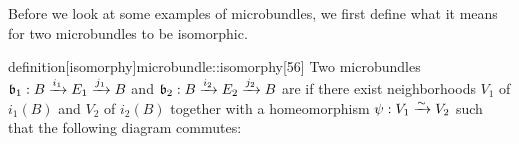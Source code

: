 \begin{myparagraph}
    Before we look at some examples of microbundles,
    we first define what it means for two microbundles to be isomorphic.
\end{myparagraph}

\begin{mystatement}{definition}[isomorphy]{microbundle::isomorphy}[56]
    Two microbundles $\bundledef{\bb_1}{B}{E_1}{i_1}{j_1}$ and $\bundledef{\bb_2}{B}{E_2}{i_2}{j_2}$
    are  if there exist neighborhoods $V_1$ of $i_1(B)$ and $V_2$ of $i_2(B)$
    together with a homeomorphism $\psi: V_1 \xrightarrow{\sim} V_2$
    such that the following diagram commutes: 
    \begin{center}
    \end{center}
\end{mystatement}